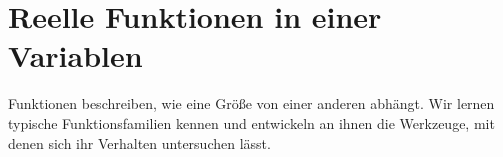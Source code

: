\chapter{Reelle Funktionen in einer Variablen}
\label{chap:real_functions}

Funktionen beschreiben, wie eine Größe von einer anderen abhängt.
Wir lernen typische Funktionsfamilien kennen und entwickeln an ihnen die
Werkzeuge, mit denen sich ihr Verhalten untersuchen lässt.


\clearpage

\clearpage

\clearpage

\clearpage

\clearpage

\clearpage

\clearpage

\clearpage

\clearpage

\clearpage

\clearpage

